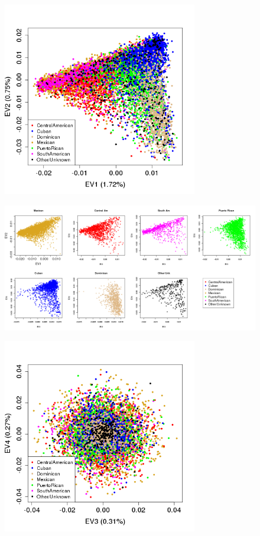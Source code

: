 \documentclass{beamer}
\begin{document}
\begin{frame}
\centering
\begin{figure}
\includegraphics[height=8.5cm]{../eigen_unrel_adjXkc_adjAutoPC15_xPrunedKC_ev12_col.png}
\end{figure}
\end{frame}

\begin{frame}
\begin{figure}
\includegraphics[width=11.5cm]{../eigen_unrel_adjXkc_adjAutoPC15_xPrunedKC_ev12_eachCol.png}
\end{figure}
\end{frame}

\begin{frame}
\begin{figure}
\includegraphics[height=8.5cm]{../eigen_unrel_adjXkc_adjAutoPC15_xPrunedKC_ev34_col.png}
\end{figure}
\end{frame}
\end{document}
